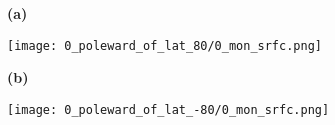 \documentclass[preview]{standalone}
\begin{document}
\begin{figure}

  \begin{subfigure}[t]{0.05\textwidth}
    \textbf{\large{(a)}}
  \end{subfigure}
  \begin{subfigure}[t]{0.95\textwidth}
    \texttt{[image: 0\_poleward\_of\_lat\_80/0\_mon\_srfc.png]}
  \end{subfigure}

  \begin{subfigure}[t]{0.05\textwidth}
    \textbf{\large{(b)}}
  \end{subfigure}
  \begin{subfigure}[t]{0.95\textwidth}
    \texttt{[image: 0\_poleward\_of\_lat\_-80/0\_mon\_srfc.png]}
  \end{subfigure}

\end{figure}
\end{document}
